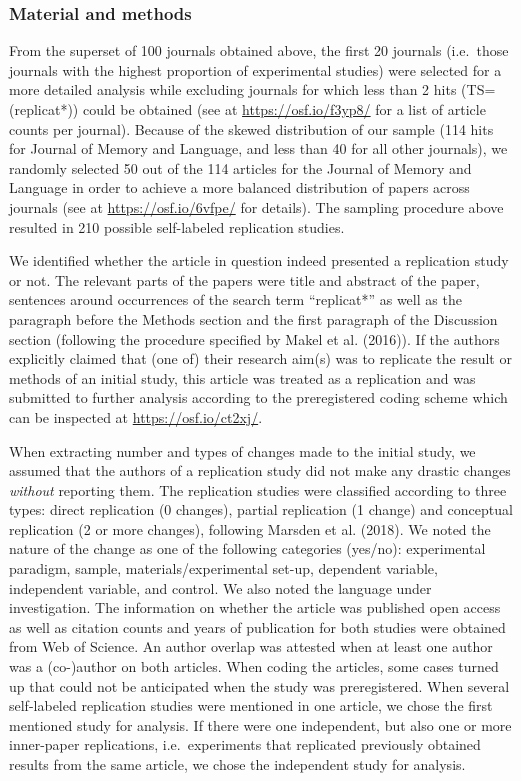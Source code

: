 \documentclass[]{elsarticle} %
\begin{document}
\hypertarget{material-and-methods-1}{%
\subsubsection{Material and methods}\label{material-and-methods-1}}

From the superset of 100 journals obtained above, the first 20 journals
(i.e.~those journals with the highest proportion of experimental
studies) were selected for a more detailed analysis while excluding
journals for which less than 2 hits (TS=(replicat*)) could be obtained
(see at \url{https://osf.io/f3yp8/} for a list of article counts per
journal). Because of the skewed distribution of our sample (114 hits for
Journal of Memory and Language, and less than 40 for all other
journals), we randomly selected 50 out of the 114 articles for the
Journal of Memory and Language in order to achieve a more balanced
distribution of papers across journals (see at
\url{https://osf.io/6vfpe/} for details). The sampling procedure above
resulted in 210 possible self-labeled replication studies.

We identified whether the article in question indeed presented a
replication study or not. The relevant parts of the papers were title
and abstract of the paper, sentences around occurrences of the search
term ``replicat*'' as well as the paragraph before the Methods section
and the first paragraph of the Discussion section (following the
procedure specified by Makel et al. (2016)). If the authors explicitly
claimed that (one of) their research aim(s) was to replicate the result
or methods of an initial study, this article was treated as a
replication and was submitted to further analysis according to the
preregistered coding scheme which can be inspected at
\url{https://osf.io/ct2xj/}.

When extracting number and types of changes made to the initial study,
we assumed that the authors of a replication study did not make any
drastic changes \emph{without} reporting them. The replication studies
were classified according to three types: direct replication (0
changes), partial replication (1 change) and conceptual replication (2
or more changes), following Marsden et al. (2018). We noted the nature
of the change as one of the following categories (yes/no): experimental
paradigm, sample, materials/experimental set-up, dependent variable,
independent variable, and control. We also noted the language under
investigation. The information on whether the article was published open
access as well as citation counts and years of publication for both
studies were obtained from Web of Science. An author overlap was
attested when at least one author was a (co-)author on both articles.
When coding the articles, some cases turned up that could not be
anticipated when the study was preregistered. When several self-labeled
replication studies were mentioned in one article, we chose the first
mentioned study for analysis. If there were one independent, but also
one or more inner-paper replications, i.e.~experiments that replicated
previously obtained results from the same article, we chose the
independent study for analysis.
\end{document}
